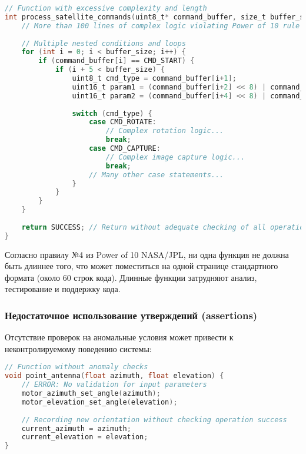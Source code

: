 \begin{lstlisting}[language=C, caption=Чрезмерно длинная и сложная функция]
// Function with excessive complexity and length
int process_satellite_commands(uint8_t* command_buffer, size_t buffer_size) {
    // More than 100 lines of complex logic violating Power of 10 rule #4...
    
    // Multiple nested conditions and loops
    for (int i = 0; i < buffer_size; i++) {
        if (command_buffer[i] == CMD_START) {
            if (i + 5 < buffer_size) {
                uint8_t cmd_type = command_buffer[i+1];
                uint16_t param1 = (command_buffer[i+2] << 8) | command_buffer[i+3];
                uint16_t param2 = (command_buffer[i+4] << 8) | command_buffer[i+5];
                
                switch (cmd_type) {
                    case CMD_ROTATE:
                        // Complex rotation logic...
                        break;
                    case CMD_CAPTURE:
                        // Complex image capture logic...
                        break;
                    // Many other case statements...
                }
            }
        }
    }
    
    return SUCCESS; // Return without adequate checking of all operations
}
\end{lstlisting}

Согласно правилу №4 из Power of 10 NASA/JPL, ни одна функция не должна быть длиннее того, что может поместиться на одной странице стандартного формата (около 60 строк кода)\cite{opensourcesatellite}. Длинные функции затрудняют анализ, тестирование и поддержку кода.

\subsubsection{Недостаточное использование утверждений (assertions)}

Отсутствие проверок на аномальные условия может привести к неконтролируемому поведению системы\cite{opensourcesatellite}:

\begin{lstlisting}[language=C, caption=Недостаточное использование утверждений]
// Function without anomaly checks
void point_antenna(float azimuth, float elevation) {
    // ERROR: No validation for input parameters
    motor_azimuth_set_angle(azimuth);
    motor_elevation_set_angle(elevation);
    
    // Recording new orientation without checking operation success
    current_azimuth = azimuth;
    current_elevation = elevation;
}
\end{lstlisting}

